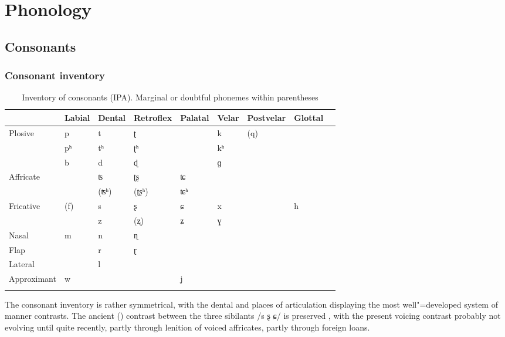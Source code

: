 \chapter{Phonology}
\label{chap:3}

\section{Consonants}
\label{sec:3-1}

\subsection{Consonant inventory}

\begin{table}[ht]
\caption{Inventory of consonants (IPA). Marginal or doubtful phonemes within parentheses}
\begin{tabularx}{\textwidth}{ P{20mm} Q Q Q Q Q Q Q Q }
\lsptoprule
&
La\-bi\-al &
Den\-tal &
Retro\-flex &
Pa\-la\-tal &
Ve\-lar &
Post\-velar &
Glot\-tal \\\hline
Plo\-sive
&
p &
t &
ʈ &
&
k &
(q) &
\\
&
pʰ &
tʰ &
ʈʰ &
&
kʰ &
&
\\
&
b &
d &
ɖ &
&
ɡ &
&
\\
Affricate
&
&
ʦ &
ʈʂ &
ʨ &
&
&
\\
&
&
(ʦʰ) &
(ʈʂʰ) &
ʨʰ &
&
&
\\
Fricative
&
(f) &
s &
ʂ &
ɕ &
x &
&
h\\
&
&
z &
(ʐ) &
ʑ &
ɣ &
&
\\
Nasal
&
m &
n &
ɳ &
&
&
&
\\
Flap
&
&
r &
ɽ &
&
&
&
\\
Lateral 
&
&
l &
&
&
&
&
\\
Approximant
&
w &
&
&
j &
&
&
\\\lspbottomrule
\end{tabularx}
\label{tab:3-1}
\end{table}

The consonant inventory is rather symmetrical, with the dental and  places of articulation displaying the most well"=developed system of manner contrasts. The ancient () contrast between the three sibilants /s ʂ ɕ/ is preserved \citep[375]{cardonaluraghi2009}, with the present voicing contrast probably not evolving until quite recently, partly through lenition of voiced affricates, partly through foreign loans. 

